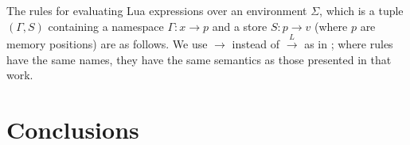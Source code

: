 \documentclass[english]{llncs}
\begin{document}
The rules for evaluating Lua expressions over an environment $\Sigma$,
which is a tuple $(\Gamma,S)$ containing a namespace $\Gamma:x\rightarrow p$
and a store $S:p\rightarrow v$ (where $p$ are memory positions)
are as follows. We use $\rightarrow$ instead of $\overset{L}{\rightarrow}$
as in \cite{DeVito2013Terra}; where rules have the same names, they have the
same semantics as those presented in that work.

\section{Conclusions}





\end{document}
